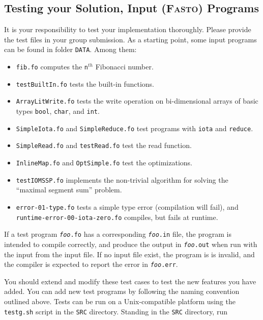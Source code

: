\documentclass[a4paper,11pt]{article}
\newcommand{\fasto}{\textsc{Fasto}\xspace}
\begin{document}
\subsection {Testing your Solution, Input (\fasto) Programs}
\label{InpPrgs}

It is your responsibility to test your implementation thoroughly.
Please provide the test files in your group submission.
%
As a starting point, some input programs can be found 
in folder {\tt DATA}. Among them:

\begin{itemize}
\setlength{\itemsep}{0.1ex}
\setlength{\parskip}{0.1ex}
    \item {\tt fib.fo} computes the {\tt n}$^{th}$ Fibonacci number.
    \item {\tt testBuiltIn.fo} tests the built-in functions.
    \item {\tt ArrayLitWrite.fo} tests the write operation on bi-dimensional arrays of
            basic types {\tt bool}, {\tt char}, and {\tt int}.
    \item {\tt SimpleIota.fo} and {\tt SimpleReduce.fo} test programs with {\tt iota} and {\tt reduce}.
    \item {\tt SimpleRead.fo} and \texttt{testRead.fo} test the read function.
    \item {\tt InlineMap.fo} and {\tt OptSimple.fo} test the optimizations. 
    \item {\tt testIOMSSP.fo} implements the non-trivial algorithm for solving the
            ``maximal segment sum'' problem.
    \item {\tt error-01-type.fo} tests a simple type error (compilation will fail),
    	and {\tt runtime-error-00-iota-zero.fo} compiles, but fails at runtime.
\end{itemize}

If a test program \texttt{\textit{foo}.fo} has a corresponding
\texttt{\textit{foo}.in} file, the program is intended to compile
correctly, and produce the output in \texttt{\textit{foo}.out} when
run with the input from the input file.  If no input file exist, the
program is is invalid, and the compiler is expected to report the
error in \texttt{\textit{foo}.err}.

You should extend and modify these test cases to test the new features
you have added.  You can add new test programs by following the naming
convention outlined above.
%
Tests can be run on a Unix-compatible platform using the
\texttt{testg.sh} script in the \texttt{SRC} directory.  Standing in
the \texttt{SRC} directory, run
\end{document}
